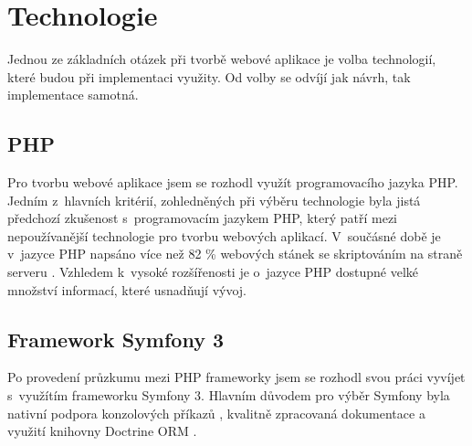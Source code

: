 \section{Technologie}
Jednou ze základních otázek při tvorbě webové aplikace je volba technologií, které budou při implementaci využity. Od volby se odvíjí jak návrh, tak implementace samotná. 

\subsection{PHP}
Pro tvorbu webové aplikace jsem se rozhodl využít programovacího jazyka \gls{PHP}. Jedním z~hlavních kritérií, zohledněných při výběru technologie byla jistá předchozí zkušenost s~programovacím jazykem PHP, který patří mezi nepoužívanější technologie pro tvorbu webových aplikací. V~součásné době je v~jazyce PHP napsáno více než 82 \% webových stánek se skriptováním na straně serveru \autocite{web:statistics}. Vzhledem k~vysoké rozšířenosti je o~jazyce PHP dostupné velké množství informací, které usnadňují vývoj. 

\subsection{Framework Symfony 3}
Po provedení průzkumu mezi PHP frameworky jsem se rozhodl svou práci vyvíjet s~využítím frameworku Symfony 3. Hlavním důvodem pro výběr Symfony byla nativní podpora konzolových příkazů \autocite{symfony:console}, kvalitně zpracovaná dokumentace a využití knihovny Doctrine \gls{ORM} \autocite{symfony:doctrine}.